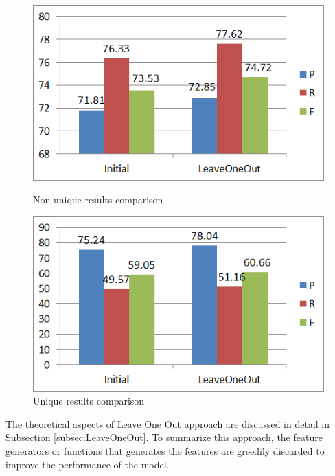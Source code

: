 \begin{figure}
\centering
\begin{minipage}{.5\textwidth}
  \centering
  \includegraphics[width=.95\textwidth]{figures/LeaveOneOutNUniq.png}
  \caption{Non unique results comparison}
  \label{fig:LeaveOO_NU}
\end{minipage}%
\begin{minipage}{.5\textwidth}
  \centering
  \includegraphics[width=.95\textwidth]{figures/LeaveOneOutUniq.png}
  \caption{Unique results comparison}
  \label{fig:LeaveOO_U}
\end{minipage}
\end{figure}

The theoretical aspects of Leave One Out approach are discussed in detail in Subsection \ref{subsec:LeaveOneOut}. To summarize this approach, the feature generators or functions that generates the features are greedily discarded to improve the performance of the model.

